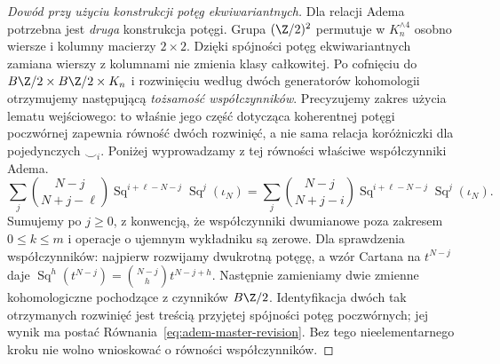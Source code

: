 \begin{proof}[Dowód przy użyciu konstrukcji potęg ekwiwariantnych]
Dla relacji Adema potrzebna jest \emph{druga}
konstrukcja potęgi. Grupa
$(\Z/2)^2$ permutuje w $K_n^{\wedge4}$
osobno wiersze i kolumny macierzy $2\times2$.
Dzięki spójności potęg ekwiwariantnych zamiana
wierszy z kolumnami nie zmienia klasy całkowitej.
Po cofnięciu do
$B\Z/2\times B\Z/2\times K_n$ i rozwinięciu
według dwóch generatorów kohomologii otrzymujemy
następującą \emph{tożsamość współczynników}.
Precyzujemy zakres użycia lematu wejściowego:
to właśnie jego część dotycząca koherentnej
potęgi poczwórnej zapewnia równość dwóch rozwinięć,
a nie sama relacja koróżniczki dla pojedynczych
$\smile_i$. Poniżej wyprowadzamy z tej równości
właściwe współczynniki Adema.
\begin{equation}\label{eq:adem-master-revision}
 \sum_j\binom{N-j}{N+j-\ell}
 \operatorname{Sq}^{i+\ell-N-j}\operatorname{Sq}^{j}(\iota_N)
 =\sum_j\binom{N-j}{N+j-i}
 \operatorname{Sq}^{i+\ell-N-j}\operatorname{Sq}^{j}(\iota_N).
\end{equation}
Sumujemy po $j\ge0$, z konwencją, że współczynniki
dwumianowe poza zakresem $0\le k\le m$ i operacje
o ujemnym wykładniku są zerowe. Dla sprawdzenia
współczynników: najpierw rozwijamy dwukrotną potęgę,
a wzór Cartana na $t^{N-j}$ daje
$\operatorname{Sq}^{h}(t^{N-j})
=\binom{N-j}{h}t^{N-j+h}$.
Następnie zamieniamy dwie zmienne kohomologiczne
pochodzące z czynników $B\Z/2$.
Identyfikacja dwóch tak otrzymanych rozwinięć
jest treścią przyjętej spójności potęg poczwórnych;
jej wynik ma postać
Równania~\ref{eq:adem-master-revision}.
Bez tego nieelementarnego kroku nie wolno
wnioskować o równości współczynników.


\end{proof}
